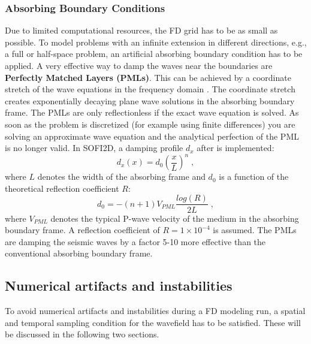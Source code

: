 \subsubsection{Absorbing Boundary Conditions}
Due to limited computational resources, the FD grid has to be as small as possible. To model problems with an infinite extension in different directions, e.g., a full or half-space problem,  an artificial absorbing boundary condition has to be applied. A very effective way to damp the waves near the boundaries are {\textbf{Perfectly Matched Layers (PMLs)}}. This can be achieved by a coordinate stretch of the wave equations in the frequency domain \cite{komatitsch:07}. The coordinate stretch creates exponentially decaying plane wave solutions in the absorbing boundary frame. The PMLs are only reflectionless if the exact wave equation is solved. As soon as the problem is discretized (for example using finite differences) you are solving an approximate wave equation and the analytical perfection of the PML is no longer valid. In SOFI2D, a damping profile $d_x$ after \citet{collino2001application} is implemented:
\begin{equation}
    d_x(x) = d_0\left(\frac{x}{L}\right)^n\;,
\end{equation}
where $L$ denotes the width of the absorbing frame and $d_0$ is a function of the theoretical reflection coefficient $R$:
\begin{equation}
    d_0 = -\left(n+1\right) V_{PML}\frac{log(R)}{2L}\;,
\end{equation}
where $V_{PML}$ denotes the typical P-wave velocity of the medium in the absorbing boundary frame. A reflection coefficient of $R=1 \times 10^{-4}$ is assumed. The PMLs are damping the seismic waves by a factor 5-10 more effective than the conventional absorbing boundary frame.

\subsection{Numerical artifacts and instabilities}
\label{num_instab}
To avoid numerical artifacts and instabilities during a FD modeling run, a spatial and temporal sampling condition for the wavefield has to be satisfied. These will be discussed in the following two sections. 


